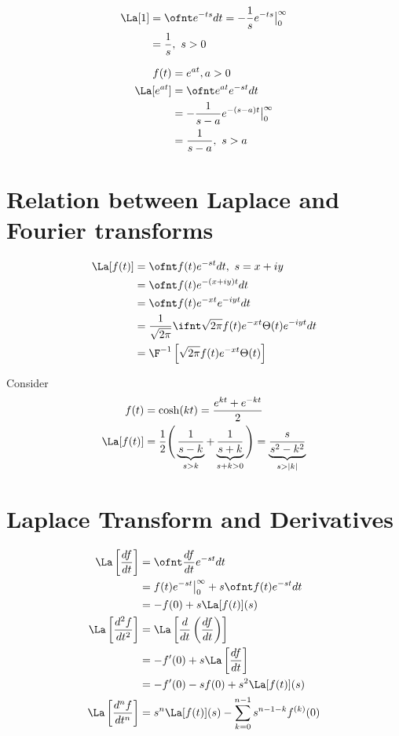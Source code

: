 \documentclass[cplx.tex]{subfiles}
\begin{document}
\begin{example}
    \begin{align}
        \La[1] &= \ofnt e^{-ts}dt = -\frac{1}{s}e^{-ts}\big|_0^\infty \\
               &= \frac{1}{s},~ s>0
    \end{align}
\end{example}

\begin{example}
    \begin{align}
        f(t) &= e^{at}, a>0 \\
        \La[e^{at}] &= \ofnt e^{at}e^{-st}dt \\
                    &= -\frac{1}{s-a} e^{-(s-a)t}\big|_0^\infty \\
                    &= \frac{1}{s-a},~ s>a
    \end{align}
\end{example}

\section{Relation between Laplace and Fourier transforms}
\begin{align}
    \La[f(t)] &= \ofnt f(t)e^{-st}dt,~ s=x+iy \\
              &= \ofnt f(t)e^{-(x+iy)t}dt \\
              &= \ofnt f(t)e^{-xt}e^{-iyt}dt \\
              &= \frac{1}{\sqrt{2\pi}} \ifnt \sqrt{2\pi}f(t)e^{-xt}\Theta(t)e^{-iyt}dt \\
              &= \F^{-1}\left[\sqrt{2\pi}f(t)e^{-xt}\Theta(t)\right]
\end{align}

Consider
\begin{align}
    f(t) &= \cosh(kt) = \frac{e^{kt} + e^{-kt}}{2} \\
    \La[f(t)] &= \frac12\Bigg(\underbrace{\frac{1}{s-k}}_{s>k} + \underbrace{\frac{1}{s+k}}_{s+k>0}\Bigg) = \underbrace{\frac{s}{s^2-k^2}}_{s>|k|}
\end{align}

\section{Laplace Transform and Derivatives}
\begin{align}
    \La\left[\frac{df}{dt}\right] &= \ofnt \frac{df}{dt}e^{-st}dt \\
                                  &= f(t)e^{-st}\big|_0^\infty + s\ofnt f(t)e^{-st}dt \\
                                  &= -f(0) + s\La[f(t)](s) \\
    \La\left[\frac{d^2f}{dt^2}\right] &= \La\left[\frac{d}{dt}\left(\frac{df}{dt}\right)\right] \\
                                      &= -f'(0) + s\La\left[\frac{df}{dt}\right] \\
                                      &= -f'(0) - sf(0) + s^2\La[f(t)](s) \\
    \La\left[\frac{d^nf}{dt^n}\right] &= s^n\La[f(t)](s) - \sum_{k=0}^{n-1} s^{n-1-k}f^{(k)}(0)
\end{align}
\end{document}
